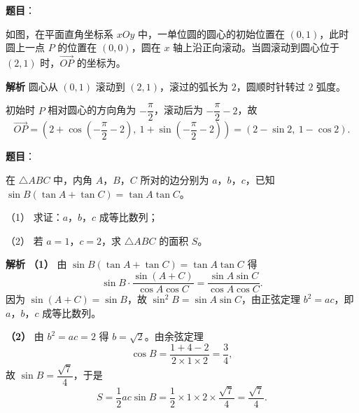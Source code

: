 \begin{answer}

\textbf{题目}：

如图，在平面直角坐标系 $xOy$ 中，一单位圆的圆心的初始位置在 $(0,1)$，此时圆上一点 $P$ 的位置在 $(0,0)$，圆在 $x$ 轴上沿正向滚动。当圆滚动到圆心位于 $(2,1)$ 时，$\overrightarrow{OP}$ 的坐标为\gkblank{}。
\nopagebreak[4]
\begin{center}\end{center}
\nopagebreak[4]
\textbf{解析}
圆心从 $(0,1)$ 滚动到 $(2,1)$，滚过的弧长为 $2$，圆顺时针转过 $2$ 弧度。

初始时 $P$ 相对圆心的方向角为 $-\dfrac\pi2$，滚动后为 $-\dfrac\pi2-2$，故
\nopagebreak[4]
\[\overrightarrow{OP}=\left(2+\cos\left(-\frac\pi2-2\right),\ 1+\sin\left(-\frac\pi2-2\right)\right)=(2-\sin2,\ 1-\cos2).\]


\end{answer}
\begin{answer}

\textbf{题目}：

在 $\triangle ABC$ 中，内角 $A$，$B$，$C$ 所对的边分别为 $a$，$b$，$c$，已知 $\sin B(\tan A+\tan C)=\tan A\tan C$。

（1） 求证：$a$，$b$，$c$ 成等比数列；

（2） 若 $a=1$，$c=2$，求 $\triangle ABC$ 的面积 $S$。

\textbf{解析}
\textbf{（1）} 由 $\sin B(\tan A+\tan C)=\tan A\tan C$ 得
\nopagebreak[4]
\[\sin B\cdot\frac{\sin(A+C)}{\cos A\cos C}=\frac{\sin A\sin C}{\cos A\cos C}.\]
因为 $\sin(A+C)=\sin B$，故 $\sin^2B=\sin A\sin C$，由正弦定理 $b^2=ac$，即 $a$，$b$，$c$ 成等比数列。

\textbf{（2）} 由 $b^2=ac=2$ 得 $b=\sqrt2$。由余弦定理
\nopagebreak[4]
\[\cos B=\frac{1+4-2}{2\times1\times2}=\frac34,\]
故 $\sin B=\dfrac{\sqrt7}4$，于是
\nopagebreak[4]
\[S=\frac12ac\sin B=\frac12\times1\times2\times\frac{\sqrt7}4=\frac{\sqrt7}4.\]



\end{answer}
